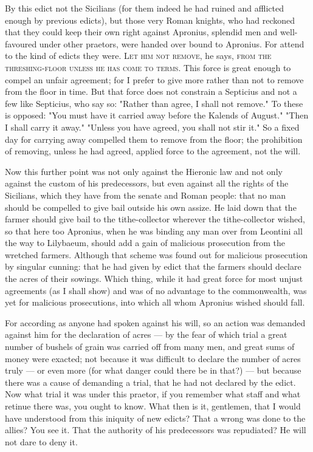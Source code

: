  By this edict not the Sicilians (for them indeed he had ruined and afflicted enough by previous edicts), but those very Roman knights, who had reckoned that they could keep their own right against Apronius, splendid men and well-favoured under other praetors, were handed over bound to Apronius. For attend to the kind of edicts they were. \textsc{Let him not remove}, he says, \textsc{from the threshing-floor unless he has come to terms}. This force is great enough to compel an unfair agreement; for I prefer to give more rather than not to remove from the floor in time. But that force does not constrain a Septicius and not a few like Septicius, who say so: "Rather than agree, I shall not remove." To these is opposed: "You must have it carried away before the Kalends of August." "Then I shall carry it away." "Unless you have agreed, you shall not stir it." So a fixed day for carrying away compelled them to remove from the floor; the prohibition of removing, unless he had agreed, applied force to the agreement, not the will.

 Now this further point was not only against the Hieronic law and not only against the custom of his predecessors, but even against all the rights of the Sicilians, which they have from the senate and Roman people: that no man should be compelled to give bail outside his own assize. He laid down that the farmer should give bail to the tithe-collector wherever the tithe-collector wished, so that here too Apronius, when he was binding any man over from Leontini all the way to Lilybaeum, should add a gain of malicious prosecution from the wretched farmers. Although that scheme was found out for malicious prosecution by singular cunning: that he had given by edict that the farmers should declare the acres of their sowings. Which thing, while it had great force for most unjust agreements (as I shall show) and was of no advantage to the commonwealth, was yet for malicious prosecutions, into which all whom Apronius wished should fall.

 For according as anyone had spoken against his will, so an action was demanded against him for the declaration of acres --- by the fear of which trial a great number of bushels of grain was carried off from many men, and great sums of money were exacted; not because it was difficult to declare the number of acres truly --- or even more (for what danger could there be in that?) --- but because there was a cause of demanding a trial, that he had not declared by the edict. Now what trial it was under this praetor, if you remember what staff and what retinue there was, you ought to know. What then is it, gentlemen, that I would have understood from this iniquity of new edicts? That a wrong was done to the allies? You see it. That the authority of his predecessors was repudiated? He will not dare to deny it.

